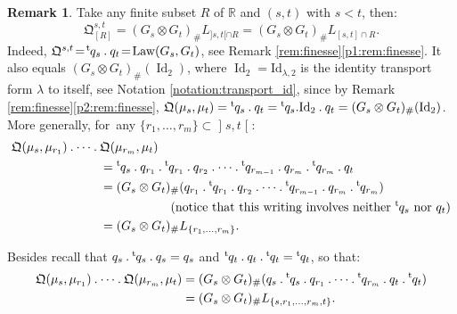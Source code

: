 \documentclass[JEP,XML,SOM,Unicode,NoEqCountersInSection,NoFloatCountersInSection,published]{cedram}
\newcommand{\ldot}{\mathbin{.}}
\newcommand{\lcdots}{\ldot\cdots\ldot}
\theoremstyle{plain}
\theoremstyle{definition}
\newtheorem{rem}[them]{Remark}
\newcommand{\id}{\mathrm{Id}}
\newcommand{\como}{\mathfrak{Q}}
\newcommand{\Id}{\operatorname{Id}}
\newcommand{\trans}{{}^{\mathrm{t}}\mkern-1mu}
\newcommand{\la}{\lambda}
\newcommand{\R}{\mathbb{R}}
\newcommand{\law}{\operatorname{Law}}
\newcommand{\op}{\mathopen}
\newcommand{\clo}{\mathclose}
\begin{document}
\begin{rem}\label{rem:comp_mini} Take any finite subset $R$ of $\R$ and $(s,t)$ with $s<t$, then:
\[\como^{s,t}_{[R]}=(G_s\otimes G_t)_\#L_{]s,t[\cap R}=(G_s\otimes G_t)_\#L_{[s,t]\cap R}.\]
Indeed, $\como^{s,t}\!=\!\trans q_s\ldot q_t\!=\!\law(G_s,G_t)$, see Remark \ref{rem:finesse}\eqref{p1:rem:finesse}. It also equals $(G_s\otimes G_t)_\#(\Id_2)$, where $\Id_2=\id_{\la,2}$ is the identity transport form $\la$ to itself, see Notation \ref{notation:transport_id}, since by Remark \ref{rem:finesse}\eqref{p2:rem:finesse}, $\como(\mu_s,\mu_t)=\trans q_s \ldot q_t=\trans q_s. \id_2 \ldot q_t=(G_s\otimes G_t)_\#(\Id_2)$. More generally, for~any $\{r_1,\ldots,r_m\}\subset\op]s,t\clo[$:
\begin{align*}
\como(\mu_{s},\mu_{r_1})\lcdots{}& \como(\mu_{r_m},\mu_{t})\\
&=\trans q_{s}{}\ldot q_{r_1}{}\ldot\trans q_{r_1}{}\ldot q_{r_2}\lcdots \trans q_{r_{m-1}}{}\ldot q_{r_{m}}{}\ldot\trans q_{r_{m}}{}\ldot q_{t}\\
&=(G_{s}\otimes G_{t})_\#(q_{r_1}{}\ldot\trans q_{r_1}{}\ldot q_{r_2}\lcdots \trans q_{r_{m-1}}{}\ldot q_{r_{m}}{}\ldot\trans q_{r_{m}})\\
&\hspace*{2cm}\text{(notice that this writing involves neither $\trans q_{s}$ nor $q_{t}$)}\\
&=(G_{s}\otimes G_t)_\#L_{\{r_1,\ldots,r_m\}}.
\end{align*}

Besides recall that $q_s\ldot\trans q_s\ldot q_s=q_s$ and $\trans q_t\ldot q_t\ldot\trans q_t=\trans q_t$, so that:
\begin{align*}
\como(\mu_{s},\mu_{r_1})\lcdots \como(\mu_{r_m},\mu_{t})
&=(G_{s}\otimes G_{t})_\#(q_{s}{}\ldot\trans q_{s}{}\ldot q_{r_1}\lcdots \trans q_{r_m}{}\ldot q_{t}{}\ldot\trans q_{t})\\
&=(G_{s}\otimes G_t)_\#L_{\{s,r_1,\ldots,r_m,t\}}.
\end{align*}
\end{rem}
\end{document}
